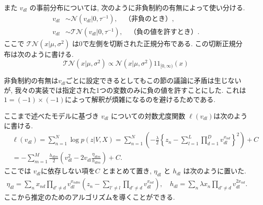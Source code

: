 \documentclass[a4paper,12ptc]{jsarticle} %
\newcommand{\normal}{\mathcal{N}}
\newcommand{\truncnorm}{\mathcal{TN}}
\newcommand{\C}{C}
\newcommand{\one}{1\!\!1}
\begin{document}
また $v_{dl}$ の事前分布については, 次のように非負制約の有無によって使い分ける.
\begin{align}
v_{dl} & \sim \normal(v_{dl} | 0,\tau^{-1}), \quad  \mbox{（非負のとき）} \label{eq_prior1}, \\
v_{dl} & \sim \truncnorm(v_{dl} | 0, \tau^{-1}), \quad  \mbox{（負の値を許すとき）.} \label{eq_prior2}
\end{align}
ここで $\truncnorm(x | \mu, \sigma^2)$ は0で左側を切断された正規分布である.
この切断正規分布は次のように書ける.
\begin{equation*}
   \truncnorm(x | \mu, \sigma^2) \propto    \normal(x | \mu, \sigma^2) \one_{[0,\infty)}(x) 
\end{equation*}

非負制約の有無は$v_{dl}$ごとに設定できるとしてもこの節の議論に矛盾は生じないが, 我々の実装では指定された1つの変数のみに負の値を許すことにした. これは$1=(-1)\times(-1)$によって解釈が煩雑になるのを避けるためである.

ここまで述べたモデルに基づき $v_{dl}$ についての対数尤度関数 $\ell(v_{dl})$は次のように書ける.
\begin{align*}
& \ell(v_{dl}) =\sum_{n=1}^{N} \log p(z|V, X)= \sum_{n=1}^{N}\left(-\frac{\lambda}{2}\left\{ z_n -\sum_{l=1}^L\prod_{d=1}^D v_{dl}^{x_{nd}} \right\}^2\right)+ \C\\
&= -\sum_{m=1}^M\frac{h_{dlm}}{2}\left(v_{dl}^2-2v_{dl}\frac{\eta_{dlm}}{h_{dlm}}\right) +C.
\end{align*}
ここでは $v_{dl}$に依存しない項を$C$ とまとめて置き, $\eta_{dl}$ と $h_{dl}$ は次のように置いた.
\begin{align*}
\eta_{dl} = \sum_n x_{nd} \prod_{d' \neq d} v_{dl}^{x_{ndm}}\left( z_{n} - \sum_{l'\neq l} \prod_{d' \neq d} v_{dl}^{x_{nd}} \right), \quad  h_{dl} = \sum_n \lambda x_{n} \prod_{d' \neq d} v_{dl}^{2x_{nd}}. %
\end{align*}
ここから推定のためのアルゴリズムを導くことができる.
\end{document}
